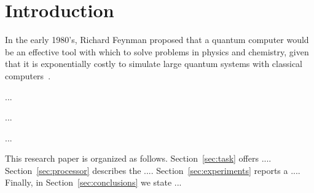 \section{Introduction}
\label{sec:introduction}
%
%
In the early 1980's, Richard Feynman proposed that a quantum computer would be
an effective tool with which to solve problems in physics and chemistry, given
that it is exponentially costly to simulate large quantum systems with
classical computers~\cite{feynman1982simulating}.

...

...

...

%
%
This research paper is organized as follows. Section~\ref{sec:task} offers
.... Section~\ref{sec:processor} describes the .... Section~\ref{sec:experiments}
reports a .... Finally, in Section~\ref{sec:conclusions} we state ...
